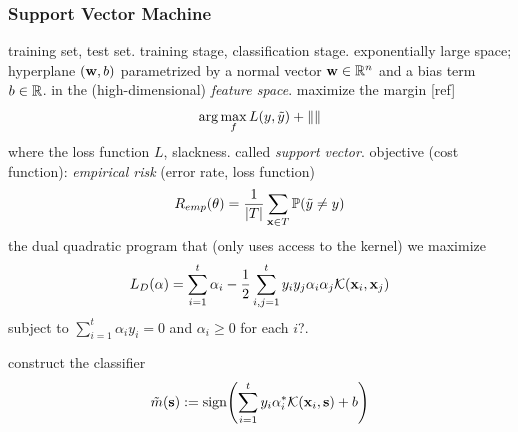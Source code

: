 \subsubsection*{Support Vector Machine}
training set, test set.
training stage, classification stage.
exponentially large space;
hyperplane $(\vb{w},b)$ parametrized by a normal vector $\vb{w}\in\mathbb{R}^n$ and a bias term $b\in\mathbb{R}$. in the (high-dimensional) \emph{feature space}.
maximize the margin [ref]
\begin{equation}
	\arg \max_f  L(y,\tilde{y}) + \norm{}
\end{equation}
where the loss function $L$, slackness. called \emph{support vector}.
objective (cost function): \emph{empirical risk} (error rate, loss function)
\begin{equation}
	R_{emp}(\vb{\theta}) = \frac{1}{\abs{T}}
	\sum_{\vb{x}\in T} \mathbb{P} (\tilde{y} \neq y)
\end{equation}
the dual quadratic program that (only uses access to the kernel)
we maximize 
\begin{equation}
	L_D(\alpha) = \sum_{i=1}^t \alpha_i - \frac{1}{2}\sum_{i,j=1}^t y_i y_j \alpha_i \alpha_j \mathcal{K}(\vb{x}_i,\vb{x}_j)
\end{equation}
subject to $\sum_{i=1}^t \alpha_i y_i = 0$ and $\alpha_i\ge 0$ for each $i$?.

construct the classifier
\begin{equation}
	\tilde{m}(\vb{s}) := \textup{sign} \qty(
		\sum_{i=1}^t y_i \alpha_i^* \mathcal{K}(\vb{x}_i,\vb{s}) + b
	)
\end{equation}

